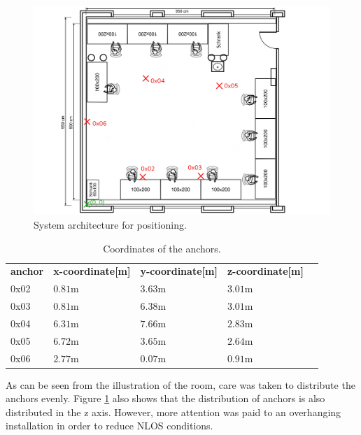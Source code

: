 \documentclass[final, conference, a4paper]{IEEEtran}
\begin{document}

\begin{figure}[hbt!]
	\centering
	\includegraphics[scale=0.08]{pic/anchor_position.png}
	\caption{System architecture for positioning.}
	\label{fig:systemarch}
\end{figure}

\begin{table}[hbt!]
	\centering
	\begin{tabular}{l l l l c}
		\textbf{anchor} & \textbf{x-coordinate[m]} & \textbf{y-coordinate[m]} & \textbf{z-coordinate[m]}\\
		0x02 & $0.81$m & $3.63$m & $3.01$m\\
		0x03 & $0.81$m & $6.38$m & $3.01$m\\
		0x04 & $6.31$m & $7.66$m & $2.83$m\\
		0x05 & $6.72$m & $3.65$m & $2.64$m\\
		0x06 & $2.77$m & $0.07$m & $0.91$m\\
		
	\end{tabular}
	\caption{Coordinates of the anchors.}
	\label{table:anchor_positions}
\end{table}

As can be seen from the illustration of the room, care was taken to distribute the anchors evenly.
Figure \ref{fig:systemarch} also shows that the distribution of anchors is also distributed in the z axis.
However, more attention was paid to an overhanging installation in order to reduce \ac{NLOS} conditions.
\end{document}
